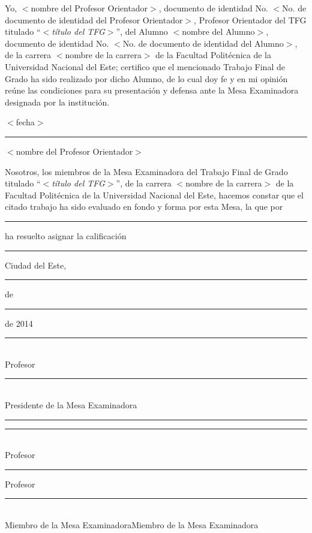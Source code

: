 \thispagestyle{empty}

Yo, $<$nombre del Profesor Orientador$>$, documento de identidad No. $<$No. de documento de identidad del Profesor Orientador$>$, Profesor Orientador del TFG titulado ``$<$\textit{título del TFG}$>$'', del Alumno $<$nombre del Alumno$>$, documento de identidad No. $<$No. de documento de identidad del Alumno$>$, de la carrera $<$nombre de la carrera$>$ de la Facultad Politécnica de la Universidad Nacional del Este; certifico que el mencionado Trabajo Final de Grado ha sido realizado por dicho Alumno, de lo cual doy fe y en mi opinión reúne las condiciones para su presentación y defensa ante la Mesa Examinadora designada por la institución.

\begin{flushright}$<$fecha$>$\end{flushright}
\vspace{0.7cm}
	
\hspace{7cm}\rule{6cm}{0.4pt}
\begin{flushright}
$<$nombre del Profesor Orientador$>$
\end{flushright}
		
\vspace{1.6cm}
Nosotros, los miembros de la Mesa Examinadora del Trabajo Final de Grado titulado ``$<$\textit{título del TFG}$>$'', de la carrera $<$nombre de la carrera$>$ de la Facultad Politécnica de la Universidad Nacional del Este, hacemos constar que el citado trabajo ha sido evaluado en fondo y forma por esta Mesa, la que por \rule{4cm}{0.4pt} ha resuelto asignar la calificación \rule{2cm}{0.4pt}

\begin{flushright}Ciudad del Este, \rule{1cm}{0.4pt} de \rule{2cm}{0.4pt} de 2014 \end{flushright}

\vspace{.5cm}
\hspace{2.2cm}\rule{7cm}{0.4pt}\\
\hspace*{3cm} Profesor \rule{4.5cm}{0.4pt}\\
\hspace*{2.8cm} Presidente de la Mesa Examinadora
\vspace{.7cm}

\hspace*{-0.4cm}\rule{6cm}{0.4pt}\hspace{1.15cm}\rule{6cm}{0.4pt}\\
\vspace{.3cm}
Profesor \rule{4.5cm}{0.4pt}		\hspace{.9cm}Profesor \rule{4.5cm}{0.4pt}\\
Miembro de la Mesa Examinadora\hspace{1cm}Miembro de la Mesa Examinadora
